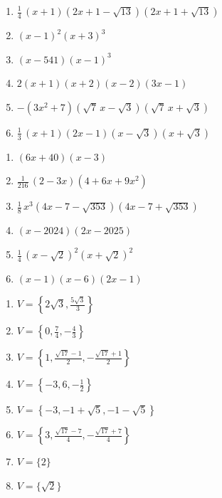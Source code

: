 \documentclass{ximera}
\begin{document}
\begin{Antwoord} \label{antw4.4}
\begin{enumerate}
\item
\hyperlink{oef4.4}{$\frac{1}{4}\,(x+1)(2x+1-\sqrt{13})(2x+1+\sqrt{13})$}
\item
\hyperlink{oef4.4}{$(x-1)^2(x+3)^3$}
\item
\hyperlink{oef4.4}{$(x-541)(x-1)^3$}
\item
\hyperlink{oef4.4}{$2(x+1)(x+2)(x-2)(3x-1)$}
\item
\hyperlink{oef4.4}{$-(3x^2+7)(\sqrt{7}\,x-\sqrt{3})(\sqrt{7}\,x+\sqrt{3})$}
\item
\hyperlink{oef4.4}{$\frac{1}{3}\,(x+1)(2x-1)(x-\sqrt{3})(x+\sqrt{3})$}
\end{enumerate}
\end{Antwoord}

\begin{Antwoord} \label{antw4.5}
\begin{enumerate}
\item
\hyperlink{oef4.5}{$(6x+40)(x-3)$}
\item
\hyperlink{oef4.5}{$\frac{1}{216}\,(2-3x)(4+6x+9x^2)$}
\item
\hyperlink{oef4.5}{$\frac{1}{8}\,x^3(4x-7-\sqrt{353})(4x-7+\sqrt{353})$}
\item
\hyperlink{oef4.5}{$(x-2024)(2x-2025)$}
\item
\hyperlink{oef4.5}{$\frac{1}{4}\,(x-\sqrt{2})^2(x+\sqrt{2})^2$}
\item
\hyperlink{oef4.5}{$(x-1)(x-6)(2x-1)$}
\end{enumerate}
\end{Antwoord}

\begin{Antwoord} \label{antw4.6}
\begin{enumerate}
\item
\hyperlink{oef4.6}{$V = \left\{ 2\sqrt{3},\frac{5\sqrt{3}}{3} \right\}$}
\item
\hyperlink{oef4.6}{$V = \left\{0,\frac{7}{4},-\frac{4}{3}\right\}$}
\item
\hyperlink{oef4.6}{$V = \left\{ 1, \frac{\sqrt{17}-1}{2}, -\frac{\sqrt{17}+1}{2} \right\}$}
\item
\hyperlink{oef4.6}{$V = \left\{-3,6,-\frac{1}{2}\right\}$}
\item
\hyperlink{oef4.6}{$V = \left\{-3,-1+\sqrt{5}, -1-\sqrt{5}\right\}$}
\item
\hyperlink{oef4.6}{$V = \left\{ 3, \frac{\sqrt{17}-7}{4}, -\frac{\sqrt{17}+7}{4} \right\}$}
\item
\hyperlink{oef4.6}{$V = \{ 2 \}$}
\item
\hyperlink{oef4.6}{$V = \{\sqrt{2}\}$}
\end{enumerate}
\end{Antwoord}
\end{document}
